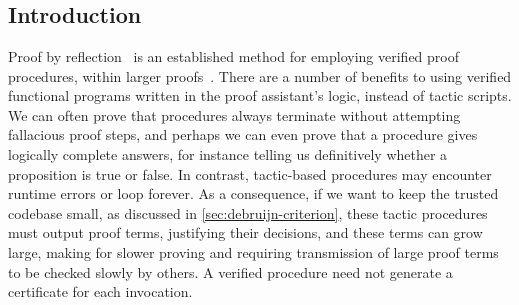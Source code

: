 \chapter{}\label{ch:reflection}

\section{Introduction}\label{sec:reflection:intro}\label{sec:reification-by-parametricity:intro:old}


Proof by reflection~\cite{ReflectionTACS97} is an established method for employing verified proof procedures, within larger proofs~\cite{MirrorShardITP14,malecha2013mirror-shard,Speeding2017Malecha,gonthier2016small}.
There are a number of benefits to using verified functional programs written in the proof assistant's logic, instead of tactic scripts.
We can often prove that procedures always terminate without attempting fallacious proof steps, and perhaps we can even prove that a procedure gives logically complete answers, for instance telling us definitively whether a proposition is true or false.
In contrast, tactic-based procedures may encounter runtime errors or loop forever.
As a consequence, if we want to keep the trusted codebase small, as discussed in \autoref{sec:debruijn-criterion}, these tactic procedures must output proof terms, justifying their decisions, and these terms can grow large, making for slower proving and requiring transmission of large proof terms to be checked slowly by others.
A verified procedure need not generate a certificate for each invocation.


